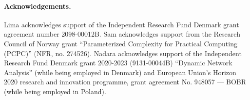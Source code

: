 \documentclass[a4paper,11pt]{article}
\begin{document}
\paragraph*{Acknowledgements.}
Lima acknowledges support of the Independent Research Fund Denmark grant agreement number 2098-00012B. Sam acknowledges support from the Research Council of Norway grant ``Parameterized Complexity for Practical Computing (PCPC)'' (NFR, no. 274526).
%
Nadara acknowledges support of the Independent Research Fund Denmark grant 2020-2023 (9131-00044B)
“Dynamic Network Analysis” (while being employed in Denmark) and European
Union’s Horizon 2020 research and innovation programme, grant agreement No.
948057 — BOBR (while being employed in Poland).



\end{document}
